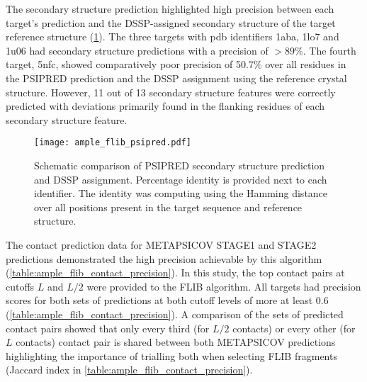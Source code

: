 The secondary structure prediction highlighted high precision between each target's prediction and the DSSP-assigned \cite{Frishman1995-si} secondary structure of the target reference structure (\cref{fig:ample_flib_psipred}). The three targets with \gls{pdb} identifiers 1aba, 1lo7 and 1u06 had secondary structure predictions with a precision of $>89$\%. The fourth target, 5nfc, showed comparatively poor precision of 50.7\% over all residues in the PSIPRED prediction and the DSSP assignment using the reference crystal structure. However, 11 out of 13 secondary structure features were correctly predicted with deviations primarily found in the flanking residues of each secondary structure feature. 

\begin{figure}[H]
	\centering
	\texttt{[image: ample\_flib\_psipred.pdf]}
	\caption[PSIPRED schema for FLIB targets]{Schematic comparison of PSIPRED \cite{Jones1999-ed} secondary structure prediction and DSSP \cite{Frishman1995-si} assignment. Percentage identity is provided next to each identifier. The identity was computing using the Hamming distance over all positions present in the target sequence and reference structure.}
	\label{fig:ample_flib_psipred}
\end{figure}

The contact prediction data for METAPSICOV STAGE1 and STAGE2 predictions demonstrated the high precision achievable by this algorithm (\cref{table:ample_flib_contact_precision}). In this study, the top contact pairs at cutoffs $L$ and $L/2$ were provided to the FLIB algorithm. All targets had precision scores for both sets of predictions at both cutoff levels of more at least 0.6 (\cref{table:ample_flib_contact_precision}). A comparison of the sets of predicted contact pairs showed that only every third (for $L/2$ contacts) or every other (for $L$ contacts) contact pair is shared between both METAPSICOV predictions highlighting the importance of trialling both when selecting FLIB fragments (Jaccard index in \cref{table:ample_flib_contact_precision}).

